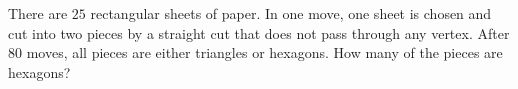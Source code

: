 There are $25$ rectangular sheets of paper. In one move, one sheet is chosen and cut into two pieces by a straight cut that does not pass through any vertex. After $80$ moves, all pieces are either triangles or hexagons. How many of the pieces are hexagons?
